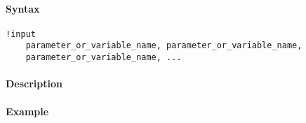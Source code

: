 


	\paragraph{Syntax}\label{syntax}

\begin{verbatim}
!input
    parameter_or_variable_name, parameter_or_variable_name,
    parameter_or_variable_name, ...
\end{verbatim}

\paragraph{Description}\label{description}

\paragraph{Example}\label{example}


